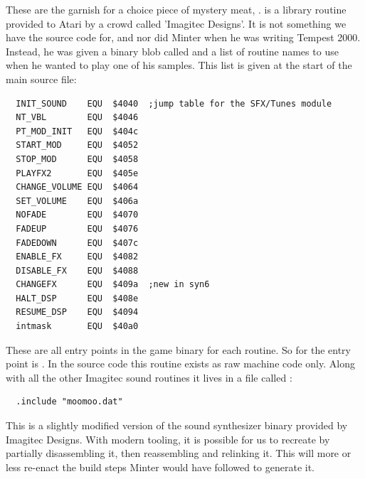 These are the garnish for a choice piece of mystery meat, .  is a
library routine provided to Atari by a crowd called 'Imagitec Designs'. It is not something we have the source
code for, and nor did Minter when he was writing Tempest 2000. Instead, he was given a binary blob
called  and a list of routine names to use when he wanted to play one of his samples.
This list is given at the start of the main  source file:

\begin{lstlisting}
  INIT_SOUND    EQU  $4040  ;jump table for the SFX/Tunes module
  NT_VBL        EQU  $4046
  PT_MOD_INIT   EQU  $404c
  START_MOD     EQU  $4052
  STOP_MOD      EQU  $4058
  PLAYFX2       EQU  $405e
  CHANGE_VOLUME EQU  $4064
  SET_VOLUME    EQU  $406a
  NOFADE        EQU  $4070
  FADEUP        EQU  $4076
  FADEDOWN      EQU  $407c
  ENABLE_FX     EQU  $4082
  DISABLE_FX    EQU  $4088
  CHANGEFX      EQU  $409a  ;new in syn6
  HALT_DSP      EQU  $408e
  RESUME_DSP    EQU  $4094
  intmask       EQU  $40a0
\end{lstlisting}

These are all entry points in the game binary for each routine. So for  the entry point is .
In the source code this routine exists as raw machine code only. Along with all the other Imagitec sound routines it
lives in a file called :
\begin{lstlisting}
  .include "moomoo.dat"
\end{lstlisting}

This is a slightly modified version of the  sound synthesizer binary provided by Imagitec Designs. With modern
tooling, it is possible for us to recreate  by partially disassembling it, then reassembling and relinking it.
This will more or less re-enact the build steps Minter would have followed to generate it.

